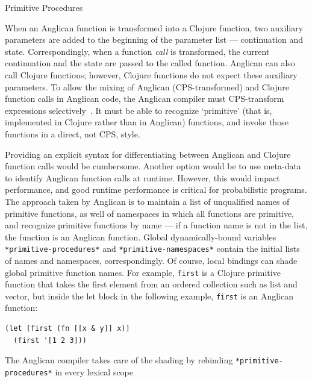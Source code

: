 \documentclass[sigconf]{acmart}
\begin{document}
\iftoggle{full}{%

}{%
}%

\iftoggle{full}{\subsubsection}{\subsection}{Primitive Procedures}
\label{seq:primitive}

When an Anglican function is transformed into a Clojure
function\iftoggle{full}{ by \texttt{fn-cps}}{}, two auxiliary
parameters are added to the beginning of the parameter list ---
continuation and state.  Correspondingly, when a function
\textit{call} is transformed\iftoggle{full}{ (by
\texttt{cps-of-application} or \texttt{cps-of-apply})}{}, the
current continuation and the state are passed to the called
function. Anglican can also call Clojure functions; however,
Clojure functions do not expect these auxiliary parameters.
To allow the mixing of Anglican (CPS-transformed) and Clojure
function calls in Anglican code, the Anglican compiler must CPS-transform
expressions selectively~\cite{Nielsen01}. It must be
able to recognize `primitive' (that is, implemented in Clojure
rather than in Anglican) functions, and invoke
those functions in a direct, not CPS, style. 

Providing an explicit syntax for differentiating between
Anglican and Clojure function calls would be cumbersome. Another
option would be to use meta-data to identify Anglican function
calls at runtime. However, this would impact performance, and
good runtime performance is critical for probabilistic
programs. The approach taken by Anglican is to maintain a list
of unqualified names of primitive functions, as well of
namespaces in which all functions are primitive, and recognize
primitive functions by name --- if a function name is not in the
list, the function is an Anglican function. Global dynamically-bound 
variables \texttt{*primitive-procedures*} and
\texttt{*primitive-namespaces*} contain the initial lists of
names and namespaces, correspondingly. Of course, local bindings
can shade global primitive function names. For example,
\texttt{first} is a Clojure primitive function that takes the first
element from an ordered collection such as list and vector,
but inside the let block in the
following example, \texttt{first} is an Anglican function:
\begin{lstlisting}[style=default]
(let [first (fn [[x & y]] x)]
  (first '[1 2 3]))
\end{lstlisting}
The Anglican compiler takes care of the shading by rebinding
\texttt{*primitive-procedures*} in every lexical
scope\iftoggle{full}{ (\texttt{fn-cps}, \texttt{cps-of-let}). Macro
\texttt{shading-primitive-procedures} automates the shading}{.}
\end{document}
